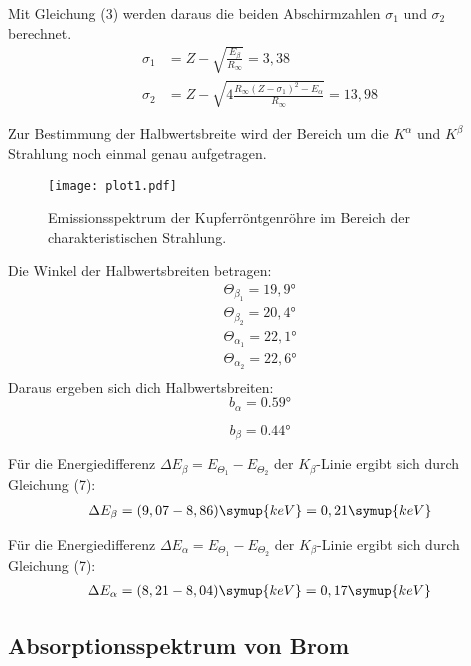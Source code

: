 Mit Gleichung (3) werden daraus die beiden Abschirmzahlen $\sigma_1$ und $\sigma_2$ berechnet.
\begin{align*}
  \sigma_1 &= Z - \sqrt{\frac{E_{\beta}}{R_{\infty}}} = 3,38 \\
  \sigma_2 &= Z - \sqrt{4 \frac{R_{\infty} (Z-\sigma_1)^2 - E_{\alpha}}{R_{\infty}}} = 13,98
\end{align*}

Zur Bestimmung der Halbwertsbreite wird der Bereich um die $K^{\alpha}$ und $K^{\beta}$ Strahlung
noch einmal genau aufgetragen.

\begin{figure}
  \centering
  \texttt{[image: plot1.pdf]}
  \caption{Emissionsspektrum der Kupferröntgenröhre im Bereich der charakteristischen Strahlung.}
  \label{fig:plot1}
\end{figure}

Die Winkel der Halbwertsbreiten betragen:
\begin{align*}
  \Theta_{\beta_1} = 19,9° \\
  \Theta_{\beta_2} = 20,4° \\
  \Theta_{\alpha_1} = 22,1° \\
  \Theta_{\alpha_2} = 22,6° \\
\end{align*}
Daraus ergeben sich dich Halbwertsbreiten:
\begin{equation*}
  b_{\alpha} = 0.59°
\end{equation*}

\begin{equation*}
  b_{\beta} = 0.44°
\end{equation*}



Für die Energiedifferenz $\Delta E_{\beta} = E_{\Theta_1} - E_{\Theta_2}$ der $K_{\beta}$-Linie ergibt sich durch Gleichung (7):
\begin{align*}
  \Delta E_{\beta} =  (9,07 - 8,86) \symup{keV} = 0,21 \symup{keV}
\end{align*}

Für die Energiedifferenz $\Delta E_{\alpha} = E_{\Theta_1} - E_{\Theta_2}$ der $K_{\beta}$-Linie ergibt sich durch Gleichung (7):
\begin{align*}
  \Delta E_{\alpha} =  (8,21 - 8,04) \symup{keV} = 0,17 \symup{keV}
\end{align*}

\subsection{Absorptionsspektrum von Brom}

